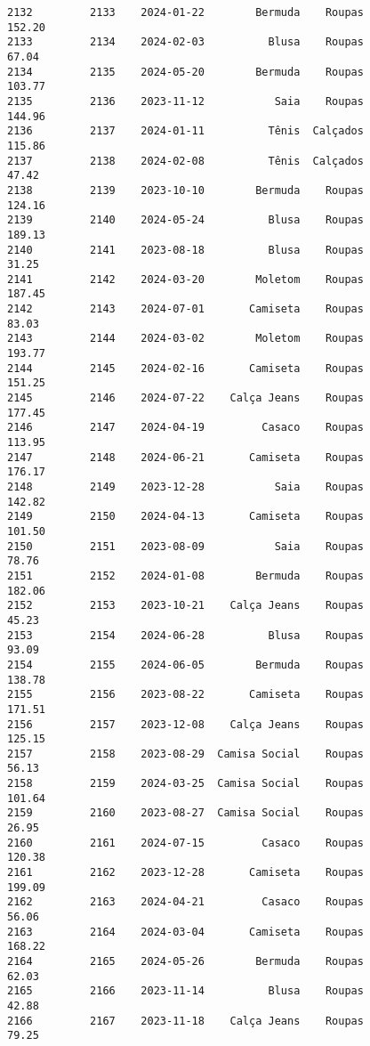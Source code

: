 \documentclass[11pt]{article}
\begin{document}
\begin{Verbatim}[commandchars=\\\{\}]
2132         2133    2024-01-22        Bermuda    Roupas          152.20   
2133         2134    2024-02-03          Blusa    Roupas           67.04   
2134         2135    2024-05-20        Bermuda    Roupas          103.77   
2135         2136    2023-11-12           Saia    Roupas          144.96   
2136         2137    2024-01-11          Tênis  Calçados          115.86   
2137         2138    2024-02-08          Tênis  Calçados           47.42   
2138         2139    2023-10-10        Bermuda    Roupas          124.16   
2139         2140    2024-05-24          Blusa    Roupas          189.13   
2140         2141    2023-08-18          Blusa    Roupas           31.25   
2141         2142    2024-03-20        Moletom    Roupas          187.45   
2142         2143    2024-07-01       Camiseta    Roupas           83.03   
2143         2144    2024-03-02        Moletom    Roupas          193.77   
2144         2145    2024-02-16       Camiseta    Roupas          151.25   
2145         2146    2024-07-22    Calça Jeans    Roupas          177.45   
2146         2147    2024-04-19         Casaco    Roupas          113.95   
2147         2148    2024-06-21       Camiseta    Roupas          176.17   
2148         2149    2023-12-28           Saia    Roupas          142.82   
2149         2150    2024-04-13       Camiseta    Roupas          101.50   
2150         2151    2023-08-09           Saia    Roupas           78.76   
2151         2152    2024-01-08        Bermuda    Roupas          182.06   
2152         2153    2023-10-21    Calça Jeans    Roupas           45.23   
2153         2154    2024-06-28          Blusa    Roupas           93.09   
2154         2155    2024-06-05        Bermuda    Roupas          138.78   
2155         2156    2023-08-22       Camiseta    Roupas          171.51   
2156         2157    2023-12-08    Calça Jeans    Roupas          125.15   
2157         2158    2023-08-29  Camisa Social    Roupas           56.13   
2158         2159    2024-03-25  Camisa Social    Roupas          101.64   
2159         2160    2023-08-27  Camisa Social    Roupas           26.95   
2160         2161    2024-07-15         Casaco    Roupas          120.38   
2161         2162    2023-12-28       Camiseta    Roupas          199.09   
2162         2163    2024-04-21         Casaco    Roupas           56.06   
2163         2164    2024-03-04       Camiseta    Roupas          168.22   
2164         2165    2024-05-26        Bermuda    Roupas           62.03   
2165         2166    2023-11-14          Blusa    Roupas           42.88   
2166         2167    2023-11-18    Calça Jeans    Roupas           79.25   

\end{Verbatim}
\end{document}
